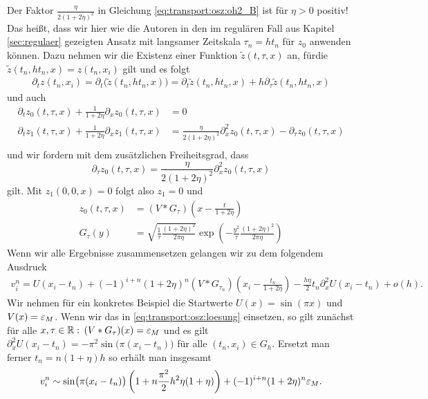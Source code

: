 Der Faktor $\frac{\eta}{2 (1 + 2 \eta)^2}$ in Gleichung \eqref{eq:transport:osz:oh2_B} ist für $\eta > 0$ positiv!
Das heißt, dass wir hier wie die Autoren in \cite{Junk2004} den im regulären Fall aus Kapitel \ref{sec:regulaer} gezeigten Ansatz mit langsamer Zeitskala $\tau_n = h t_n$ für $z_0$ anwenden können.
Dazu nehmen wir die Existenz einer Funktion $\tilde z(t,\tau,x)$ an, fürdie $\tilde z(t_n, h t_n, x) = z(t_n,x_i)$ gilt und es folgt
\begin{align*}
\partial_t z(t_n,x_i) = \partial_t \bigl( \tilde z(t_n, h t_n, x) \bigr) = \partial_t \tilde z(t_n, h t_n, x) + h \partial_\tau \tilde z(t_n, h t_n, x)
\end{align*}
und auch
\begin{align*}
\partial_t z_0(t, \tau, x) + \frac {1} {1 + 2 \eta} \partial_x z_0(t, \tau, x) &= 0\\
\partial_t z_1(t, \tau, x) + \frac {1} {1 + 2 \eta} \partial_x z_1(t, \tau, x) &= \frac{\eta}{2 (1 + 2 \eta)^2} \partial^2_x z_0(t, \tau, x) - \partial_\tau z_0(t, \tau, x)\\
\end{align*}
und wir fordern mit dem zusätzlichen Freiheitsgrad, dass
\[ 
\partial_\tau z_0(t, \tau, x) = \frac{\eta}{2 (1 + 2 \eta)^2} \partial^2_x z_0(t, \tau, x) 
\]
gilt. Mit $z_1(0,0,x) = 0$ folgt also $z_1 = 0$ und
\begin{align*}
z_0(t, \tau, x) &= (V * G_\tau)\left(x - \frac{t}{1 + 2 \eta} \right) \\
G_\tau(y) &= \sqrt {\frac{1}{\tau} \frac {(1 + 2 \eta)^2}{2 \pi \eta}} \exp\left( - \frac{y^2}{\tau} \frac {(1 + 2 \eta)^2}{2 \pi \eta} \right)
\end{align*}
Wenn wir alle Ergebnisse zusammensetzen gelangen wir zu dem folgendem Ausdruck
\begin{align}\label{eq:transport:osz:loesung}
v^n_i = U(x_i - t_n) + (-1)^{i+n} (1+ 2 \eta)^n (V * G_{\tau_n})\left(x_i - \frac{t_n}{1 + 2 \eta} \right) - \frac{h\eta} 2 t_n \partial^2_x U(x_i - t_n) + o(h).
\end{align}
Wir nehmen für ein konkretes Beispiel die Startwerte $U(x) = \sin(\pi x)$ und $V(x) = \varepsilon_M$.
Wenn wir das in \eqref{eq:transport:osz:loesung} einsetzen, so gilt zunächst für alle $x, \tau \in \mathbb R:$ $(V * G_\tau)(x) = \varepsilon_M$ und es gilt $\partial^2_x U(x_i - t_n) = -\pi^2 \sin\bigl(\pi (x_i - t_n)\bigr)$ für alle $(t_n, x_i) \in G_h$.
Ersetzt man ferner $t_n = n (1+\eta) h$ so erhält man insgesamt
\begin{align}
v^n_i \sim \sin\bigl(\pi (x_i - t_n) \bigr)\left( 1 + n \frac {\pi^2} 2 h^2 \eta (1 + \eta) \right)  + (-1)^{i+n} (1 + 2 \eta)^n \varepsilon_M .
\end{align}
